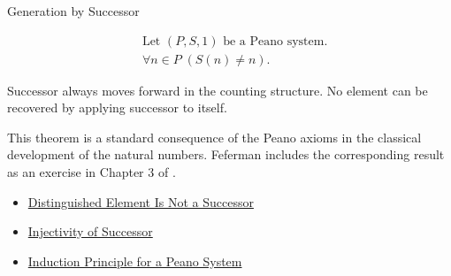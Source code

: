 \begin{topicbox}{Generation by Successor}
\begin{remark*}
\[
\begin{aligned}
&\text{Let } (P,S,1) \text{ be a Peano system.}\\
&\forall n \in P\;(S(n) \neq n).
\end{aligned}
\]
\end{remark*}

\begin{remark*}[Interpretation]
Successor always moves forward in the counting structure. No element can be
recovered by applying successor to itself.
\end{remark*}

\begin{remark*}
This theorem is a standard consequence of the Peano axioms in the classical
development of the natural numbers. Feferman includes the corresponding result
as an exercise in Chapter 3 of \citet{FefermanNumberSystems1964}.
\end{remark*}

\begin{remark*}[Dependencies]
\begin{itemize}
  \item \hyperref[ax:peano-one-not-successor]{Distinguished Element Is Not a Successor}
  \item \hyperref[ax:peano-successor-injective]{Injectivity of Successor}
  \item \hyperref[thm:induction-principle-for-peano-system]{Induction Principle for a Peano System}
\end{itemize}
\end{remark*}
\end{topicbox}
